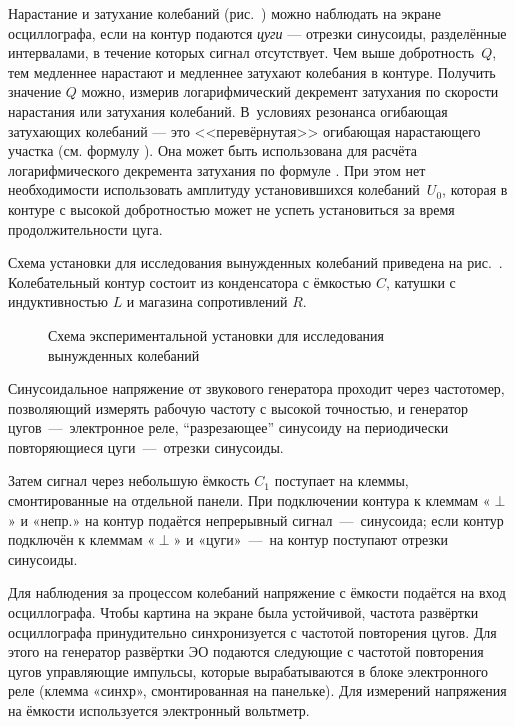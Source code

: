 Нарастание и затухание 
колебаний (рис.~) можно наблюдать 
на экране осциллографа, если на контур подаются \emph{цуги} --- отрезки 
синусоиды, разделённые интервалами, в течение которых сигнал отсутствует. 
Чем выше добротность~$Q$, тем медленнее 
нарастают и медленнее затухают колебания в контуре. Получить значение $Q$ 
можно, измерив логарифмический декремент затухания по скорости 
нарастания или затухания колебаний. В~условиях резонанса огибающая затухающих 
колебаний --- это <<перевёрнутая>> огибающая нарастающего участка 
(см. формулу ).
Она может быть использована для расчёта логарифмического декремента затухания
по формуле .
При этом нет необходимости использовать амплитуду установившихся 
колебаний~$U_0$, которая в контуре с высокой добротностью может не успеть 
установиться за время продолжительности цуга.


\experiment Схема установки для исследования
вынужденных колебаний приведена на рис.~.
Колебательный контур состоит
из конденсатора с ёмкостью $C$, катушки с индуктивностью $L$ и магазина
сопротивлений $R$.

\begin{figure}[h]
	\caption{Схема экспериментальной установки для исследования вынужденных
колебаний}
\end{figure}
Синусоидальное напряжение от звукового генератора проходит через
частотомер, позволяющий измерять рабочую частоту с высокой точностью, и
генератор цугов~---~электронное реле, ``разрезающее'' синусоиду на
периодически повторяющиеся цуги~---~отрезки синусоиды.

Затем сигнал через небольшую ёмкость $C_1$ поступает на клеммы,
смонтированные на отдельной панели. При подключении контура к клеммам
«$\perp$» и «непр.» на контур подаётся непрерывный сигнал~---~синусоида; если
контур подключён к клеммам «$\perp$» и «цуги»~---~на контур поступают отрезки
синусоиды.

Для наблюдения за процессом колебаний напряжение с ёмкости подаётся на
вход осциллографа. Чтобы картина на экране была устойчивой, частота
развёртки осциллографа принудительно синхронизуется с частотой
повторения цугов. Для этого на генератор развёртки ЭО подаются следующие
с частотой повторения цугов управляющие импульсы, которые вырабатываются
в блоке электронного реле (клемма «синхр», смонтированная на панельке).
Для измерений напряжения на ёмкости используется электронный вольтметр.

